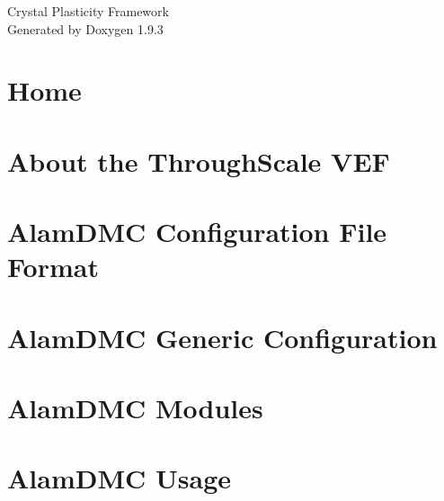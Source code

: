 \documentclass[twoside]{book}
\newcommand{\+}{\discretionary{\mbox{\scriptsize$\hookleftarrow$}}{}{}}
\newcommand{\clearemptydoublepage}{%
    \newpage{\pagestyle{empty}\cleardoublepage}%
  }
\begin{document}
  \raggedbottom
    \hypersetup{pageanchor=false,
                bookmarksnumbered=true,
                pdfencoding=unicode
               }
  \begin{titlepage}
  \vspace*{7cm}
  \begin{center}%
  {\Large Crystal Plasticity Framework}\\
  \vspace*{1cm}
  {\large Generated by Doxygen 1.9.3}\\
  \end{center}
  \end{titlepage}
  \clearemptydoublepage
  \tableofcontents
  \clearemptydoublepage
  \hypersetup{pageanchor=true}
\chapter{Home}
\label{index}\hypertarget{index}{}
\chapter{About the Through\+Scale VEF}
\label{page_about}

\chapter{Alam\+DMC Configuration File Format}
\label{page_alamdmc_format}

\chapter{Alam\+DMC Generic Configuration}
\label{page_alamdmc_generic}

\chapter{Alam\+DMC Modules}
\label{page_alamdmc_modules}

\chapter{Alam\+DMC Usage}
\label{page_alamdmc_usage}

\end{document}
